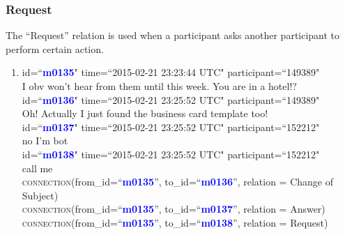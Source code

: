 \documentclass{article}
\begin{document}
\subsubsection{Request}
The ``Request'' relation is used when a participant asks another participant to perform certain action. 
\begin{enumerate}[resume]
\item id=``\textbf{\textcolor{blue}{m0135}}" time=``2015-02-21 23:23:44 UTC" participant=``149389"\\
I obv won't hear from them until this week. You are in a hotel!? \\
id=``\textbf{\textcolor{blue}{m0136}}" time=``2015-02-21 23:25:52 UTC" participant=``149389"\\
Oh! Actually I just found the business card template too!\\
id=``\textbf{\textcolor{blue}{m0137}}" time=``2015-02-21 23:25:52 UTC" participant=``152212"\\
no I’m bot\\
id=``\textbf{\textcolor{blue}{m0138}}" time=``2015-02-21 23:25:52 UTC" participant=``152212"\\
call me\\
\textsc{connection}(from\_id=``\textbf{\textcolor{blue}{m0135}}'', to\_id=``\textbf{\textcolor{blue}{m0136}}'', relation = Change of Subject)\\
\textsc{connection}(from\_id=``\textbf{\textcolor{blue}{m0135}}'', to\_id=``\textbf{\textcolor{blue}{m0137}}'', relation = Answer)\\
\textsc{connection}(from\_id=``\textbf{\textcolor{blue}{m0135}}'', to\_id=``\textbf{\textcolor{blue}{m0138}}'', relation = Request)\\
\end{enumerate}
\end{document}
